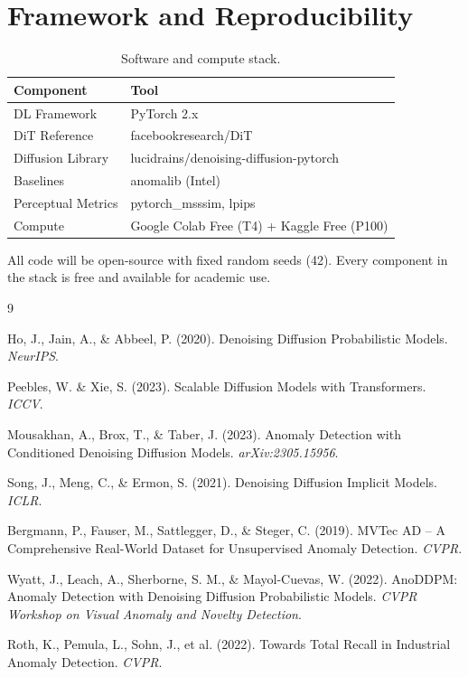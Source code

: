 \documentclass[12pt,a4paper]{article}
\begin{document}
\section{Framework and Reproducibility}

\begin{table}[H]
\centering
\caption{Software and compute stack.}
\begin{tabular}{@{}ll@{}}
\toprule
\textbf{Component} & \textbf{Tool} \\
\midrule
DL Framework       & PyTorch 2.x \\
DiT Reference      & facebookresearch/DiT \\
Diffusion Library  & lucidrains/denoising-diffusion-pytorch \\
Baselines          & anomalib (Intel) \\
Perceptual Metrics & pytorch\_msssim, lpips \\
Compute            & Google Colab Free (T4) + Kaggle Free (P100) \\
\bottomrule
\end{tabular}
\end{table}

All code will be open-source with fixed random seeds (42). Every component in
the stack is free and available for academic use.

\begin{thebibliography}{9}

Ho, J., Jain, A., \& Abbeel, P. (2020).
Denoising Diffusion Probabilistic Models.
\textit{NeurIPS}.

Peebles, W. \& Xie, S. (2023).
Scalable Diffusion Models with Transformers.
\textit{ICCV}.

Mousakhan, A., Brox, T., \& Taber, J. (2023).
Anomaly Detection with Conditioned Denoising Diffusion Models.
\textit{arXiv:2305.15956}.

Song, J., Meng, C., \& Ermon, S. (2021).
Denoising Diffusion Implicit Models.
\textit{ICLR}.

Bergmann, P., Fauser, M., Sattlegger, D., \& Steger, C. (2019).
MVTec AD -- A Comprehensive Real-World Dataset for Unsupervised Anomaly Detection.
\textit{CVPR}.

Wyatt, J., Leach, A., Sherborne, S. M., \& Mayol-Cuevas, W. (2022).
AnoDDPM: Anomaly Detection with Denoising Diffusion Probabilistic Models.
\textit{CVPR Workshop on Visual Anomaly and Novelty Detection}.

Roth, K., Pemula, L., Sohn, J., et al. (2022).
Towards Total Recall in Industrial Anomaly Detection.
\textit{CVPR}.

\end{thebibliography}
\end{document}
